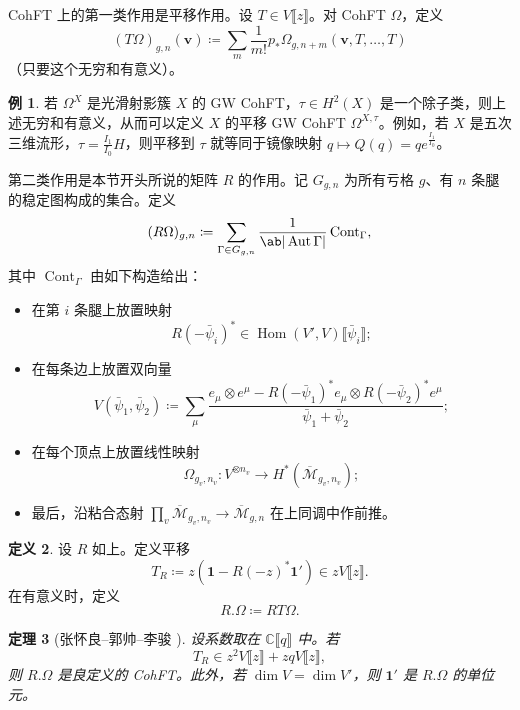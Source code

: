 \documentclass{amsart}
\newtheorem{thm}{定理}[section]
\theoremstyle{definition}
\newtheorem{defn}[thm]{定义}
\newtheorem{exm}[thm]{例}
\theoremstyle{remark}
\theoremstyle{plain}
\theoremstyle{definition}
\theoremstyle{remark}
\newcommand{\C}{\mathbb{C}}
\newcommand{\Mbar}{\overline{\mathcal{M}}}
\newcommand{\mbf}[1]{\mathbf{#1}}
\newcommand{\bv}{\mbf{v}}
\newcommand{\on}[1]{\operatorname{#1}}
\newcommand{\1}{\mathbf{1}}
\newcommand{\2}{\mathbf{2}}
\newcommand{\3}{\mathbf{3}}
\newcommand{\ps}[1]{\llbracket #1 \rrbracket}
\DeclareMathOperator{\Hom}{Hom}
\DeclareMathOperator{\Aut}{Aut}
\begin{document}
CohFT 上的第一类作用是平移作用。设 $T \in V\ps{z}$。对 CohFT $\Omega$，定义
\[ (T\Omega)_{g,n}(\bv) \coloneqq \sum_m \frac{1}{m!} p_* \Omega_{g,n+m}(\bv, T,\ldots,T) \]
（只要这个无穷和有意义）。

\begin{exm}
    若 $\Omega^X$ 是光滑射影簇 $X$ 的 GW CohFT，$\tau \in H^2(X)$ 是一个除子类，则上述无穷和有意义，从而可以定义 $X$ 的平移 GW CohFT $\Omega^{X,\tau}$。例如，若 $X$ 是五次三维流形，$\tau = \frac{I_1}{I_0} H$，则平移到 $\tau$ 就等同于镜像映射 $q \mapsto Q(q) = q e^{\frac{I_1}{I_0}}$。
\end{exm}

第二类作用是本节开头所说的矩阵 $R$ 的作用。记 $G_{g,n}$ 为所有亏格 $g$、有 $n$ 条腿的稳定图构成的集合。定义
\[ (R\Omega)_{g,n} \coloneqq \sum_{\Gamma \in G_{g,n}} \frac{1}{\ab|\Aut \Gamma|} \on{Cont}_{\Gamma}, \]
其中 $\on{Cont}_{\Gamma}$ 由如下构造给出：
\begin{itemize}
    \item 在第 $i$ 条腿上放置映射
        \[ R(-\bar{\psi}_i)^* \in \Hom(V',V) \ps{\bar{\psi}_i}; \]
    \item 在每条边上放置双向量
        \[ V(\bar{\psi}_1, \bar{\psi}_2) \coloneqq \sum_{\mu} \frac{e_{\mu} \otimes e^{\mu} - R(-\bar{\psi}_1)^* e_{\mu} \otimes R(-\bar{\psi}_2)^* e^{\mu}}{\bar{\psi}_1 + \bar{\psi}_2}; \]
    \item 在每个顶点上放置线性映射
        \[ \Omega_{g_v, n_v} \colon V^{\otimes n_v} \to H^*(\Mbar_{g_v, n_v}); \]
    \item 最后，沿粘合态射 $\prod_v \Mbar_{g_v, n_v} \to \Mbar_{g,n}$ 在上同调中作前推。
\end{itemize}

\begin{defn}
    设 $R$ 如上。定义平移
    \[ T_R \coloneqq z (\1 - R(-z)^* \1') \in z V\ps{z}. \]
    在有意义时，定义
    \[ R.\Omega \coloneqq RT\Omega. \]
\end{defn}

\begin{thm}[张怀良--郭帅--李骏 {\cite[定理~2.7]{CGL2026}}]
    设系数取在 $\C\ps{q}$ 中。若
    \[ T_R \in z^2 V \ps{z} + zq V \ps{z}, \]
    则 $R.\Omega$ 是良定义的 CohFT。此外，若 $\dim V = \dim V'$，则 $\1'$ 是 $R.\Omega$ 的单位元。
\end{thm}
\end{document}
